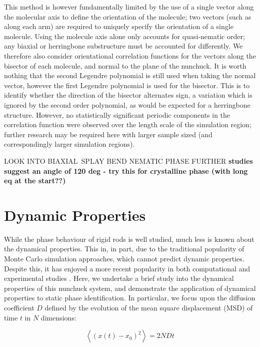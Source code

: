 \documentclass[11pt, a4paper]{article} %
\begin{document}
This method is however fundamentally limited by the use of a single vector along the molecular axis to define the orientation of the molecule; two vectors (such as along each arm) are required to uniquely specify the orientation of a single molecule. Using the molecule axis alone only accounts for quasi-nematic order; any biaxial or herringbone substructure must be accounted for differently. We therefore also consider orientational correlation functions for the vectors along the bisector of each molecule, and normal to the plane of the nunchuck. It is worth nothing that the second Legendre polynomial is still used when taking the normal vector, however the first Legendre polynomial is used for the bisector. This is to identify whether the direction of the bisector alternates sign, a variation which is ignored by the second order polynomial, as would be expected for a herringbone structure. However, no statistically significant periodic components in the correlation function were observed over the length scale of the simulation region; further research may be required here with larger sample sized (and correspondingly larger simulation regions).


LOOK INTO BIAXIAL\ SPLAY BEND NEMATIC PHASE FURTHER
\textbf{studies suggest an angle of 120 deg - try this for crystalline phase (with long eq at the start??)}

\section{Dynamic Properties} \label{sec:Dynamics}
While the phase behaviour of rigid rods is well studied, much less is known about the dynamical properties. This in, in part, due to the traditional popularity of Monte Carlo simulation approaches, which cannot predict dynamic properties. Despite this, it has enjoyed a more recent popularity in both computational and experimental studies \cite{GayBalmaz2013, Zhao2013, Rey2013}. Here, we undertake a brief study into the dynamical properties of this nunchuck system, and demonstrate the application of dynamical properties to static phase identification. In particular, we focus upon the diffusion coefficient $D$ defined by the evolution of the mean square displacement (MSD) of time $t$ in $N$ dimensions:

\begin{equation} \label{eq:msd_eq} 
\left\langle \left(x(t) - x_{0}\right)^{2} \right\rangle = 2NDt
\end{equation}
\end{document}
